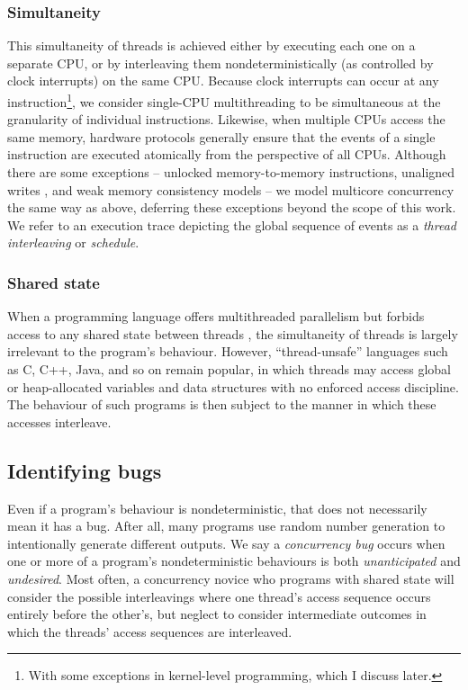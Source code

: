 \subsubsection{Simultaneity}
This simultaneity of threads is achieved either by executing each one on a separate CPU, or by interleaving them nondeterministically (as controlled by clock interrupts) on the same CPU.
Because clock interrupts can occur at any instruction\footnote{
	With some exceptions in kernel-level programming, which I discuss later.
},
we consider single-CPU multithreading to be simultaneous at the granularity of individual instructions.
%
Likewise, when multiple CPUs access the same memory,
hardware protocols generally ensure that the events of a single instruction are executed atomically from the perspective of all CPUs.
Although there are some exceptions --
unlocked memory-to-memory instructions,
unaligned writes \cite{unaligned-writes},
and weak memory consistency models \cite{memory-consistency-models} --
we model multicore concurrency the same way as above,
deferring these exceptions beyond the scope of this work.
We refer to an execution trace depicting the global sequence of events as a {\em thread interleaving} or {\em schedule}.

\subsubsection{Shared state}
When a programming language offers multithreaded parallelism but forbids access to any shared state between threads \cite{rust-language},
the simultaneity of threads is largely irrelevant to the program's behaviour.
However, ``thread-unsafe'' languages such as C, C++, Java, and so on remain popular,
in which threads may access global or heap-allocated variables and data structures with no enforced access discipline.
The behaviour of such programs is then subject to the manner in which these accesses interleave.

\subsection{Identifying bugs}

Even if a program's behaviour is nondeterministic, that does not necessarily mean it has a bug.
After all, many programs use random number generation to intentionally generate different outputs.
We say a {\em concurrency bug} occurs when one or more of a program's nondeterministic behaviours is both {\em unanticipated} and {\em undesired}.
Most often, a concurrency novice who programs with shared state will consider the possible interleavings where one thread's access sequence occurs entirely before the other's, but neglect to consider intermediate outcomes in which the threads' access sequences are interleaved.

